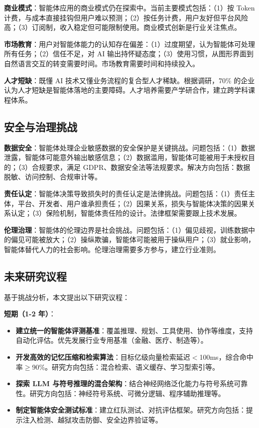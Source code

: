 \documentclass[12pt,a4paper]{article}
\begin{document}
\textbf{商业模式}：智能体应用的商业模式仍在探索中。当前主要模式包括：（1）按 Token 计费，与成本直接挂钩但用户难以预测；（2）按任务计费，用户友好但平台风险高；（3）订阅制，收入稳定但可能限制使用。商业模式创新是行业关注焦点。

\textbf{市场教育}：用户对智能体能力的认知存在偏差：（1）过度期望，认为智能体可处理所有任务；（2）信任不足，对 AI 输出持怀疑态度；（3）使用习惯，从图形界面到自然语言交互的转变需要时间。市场教育需要时间和持续投入。

\textbf{人才短缺}：既懂 AI 技术又懂业务流程的复合型人才稀缺。根据调研，70\% 的企业认为人才短缺是智能体落地的主要障碍。人才培养需要产学研合作，建立跨学科课程体系。

\subsection{安全与治理挑战}

\textbf{数据安全}：智能体处理企业敏感数据的安全保护是关键挑战。问题包括：（1）数据泄露，智能体可能意外输出敏感信息；（2）数据滥用，智能体可能被用于未授权目的；（3）合规要求，满足 GDPR、数据安全法等法规要求。解决方向包括：数据脱敏、访问控制、合规审计等。

\textbf{责任认定}：智能体决策导致损失时的责任认定是法律挑战。问题包括：（1）责任主体，平台、开发者、用户谁承担责任；（2）因果关系，损失与智能体决策的因果关系认定；（3）保险机制，智能体责任险的设计。法律框架需要跟上技术发展。

\textbf{伦理治理}：智能体的伦理边界是社会挑战。问题包括：（1）偏见歧视，训练数据中的偏见可能被放大；（2）操纵欺骗，智能体可能被用于操纵用户；（3）就业影响，智能体替代人力的社会影响。伦理治理需要多方参与，建立行业准则。

\subsection{未来研究议程}

基于挑战分析，本文提出以下研究议程：

\textbf{短期（1-2 年）}：
\begin{itemize}
    \item \textbf{建立统一的智能体评测基准}：覆盖推理、规划、工具使用、协作等维度，支持自动化评估。优先发展行业专用基准（金融、医疗、制造等）。
    
    \item \textbf{开发高效的记忆压缩和检索算法}：目标亿级向量检索延迟$<$100ms，综合命中率$\geq$90\%。研究方向包括：混合检索、语义缓存、学习型索引等。
    
    \item \textbf{探索 LLM 与符号推理的混合架构}：结合神经网络泛化能力与符号系统可靠性。研究方向包括：神经符号系统、可微分逻辑、程序辅助推理等。
    
    \item \textbf{制定智能体安全测试标准}：建立红队测试、对抗评估框架。研究方向包括：提示注入检测、越狱攻击防御、安全边界验证等。
\end{itemize}
\end{document}
